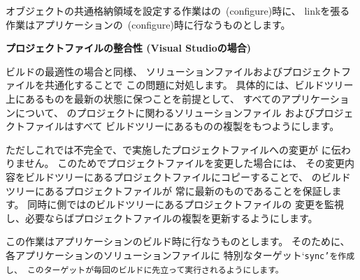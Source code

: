 \begin{narrow}[20pt]
	\medskip
	オブジェクトの共通格納領域を設定する作業は\SprLib の\cmake\ (configure)時に、
	linkを張る作業はアプリケーションの\cmake\ (configure)時に行なうものとします。
\end{narrow}

\medskip
\bf{プロジェクトファイルの整合性 (Visual Studioの場合)}
\begin{narrow}[20pt]
	ビルドの最適性の場合と同様、
	ソリューションファイルおよびプロジェクトファイルを共通化することで
	この問題に対処します。
	具体的には、\SprLib ビルドツリー上にあるものを最新の状態に保つことを前提として、
	すべてのアプリケーションについて、
	\SprLib のプロジェクトに関わるソリューションファイル
	およびプロジェクトファイルはすべて
	\SprLib ビルドツリーにあるものの複製をもつようにします。

	\medskip
	ただしこれでは不完全で、で実施したプロジェクトファイルへの変更が
	に伝わりません。
	このためでプロジェクトファイルを変更した場合には、
	その変更内容を\SprLib ビルドツリーにあるプロジェクトファイルにコピーすることで、
	\SprLib のビルドツリーにあるプロジェクトファイルが
	常に最新のものであることを保証します。
	同時に側では\SprLib のビルドツリーにあるプロジェクトファイルの
	変更を監視し、必要ならばプロジェクトファイルの複製を更新するようにします。

	\medskip
	この作業はアプリケーションのビルド時に行なうものとします。
	そのために、各アプリケーションのソリューションファイルに
	特別なターゲット`\tt{sync}'を作成し、
	このターゲットが毎回のビルドに先立って実行されるようにします。


\end{narrow}
